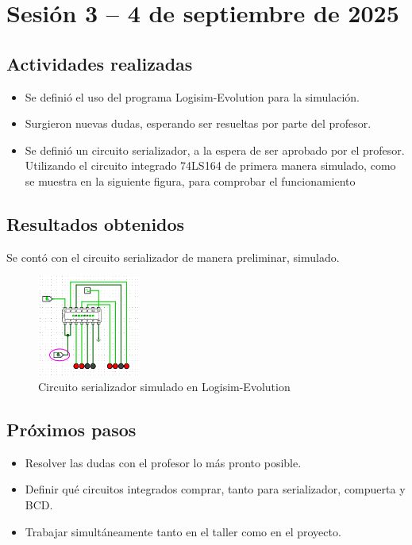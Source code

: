 \documentclass[12pt,letterpaper]{article}
\begin{document}
\section{Sesión 3 -- 4 de septiembre de 2025}
\subsection*{Actividades realizadas}
\begin{itemize}
    \item Se definió el uso del programa Logisim-Evolution para la simulación.
    \item Surgieron nuevas dudas, esperando ser resueltas por parte del profesor.
    \item Se definió un circuito serializador, a la espera de ser aprobado por el profesor. Utilizando el circuito integrado 74LS164 de primera manera simulado, como se muestra en la siguiente figura, para comprobar el funcionamiento
\end{itemize}

\subsection*{Resultados obtenidos}
Se contó con el circuito serializador de manera preliminar, simulado.
\begin{figure}[H]
    \centering
    \includegraphics[width=0.3\textwidth]{images/serializador_sim.png} %
    \caption{Circuito serializador simulado en Logisim-Evolution}
    \label{fig:serializador_sim}
\end{figure}

\subsection*{Próximos pasos}
\begin{itemize}
    \item Resolver las dudas con el profesor lo más pronto posible.
    \item Definir qué circuitos integrados comprar, tanto para serializador, compuerta y BCD.
    \item Trabajar simultáneamente tanto en el taller como en el proyecto.
\end{itemize}
\end{document}
